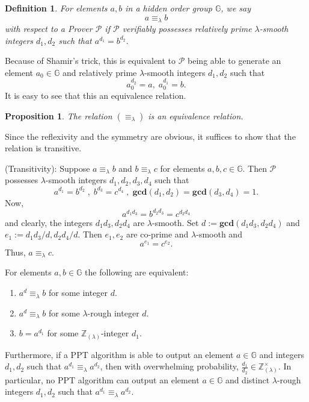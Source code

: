\documentclass[11pt, lettersize, notitlepage, leqno, footskip=0.6cm]{article}
\newcommand{\bz}{\mathbb Z}
\newcommand{\eqlam}{\equiv_{\lam}}
\newcommand{\mc}{\mathcal}
\newcommand{\mb}{\mathbb}
\newcommand{\mbf}{\mathbf}
\newcommand{\lam}{\lambda}
\newcommand{\lamb}{\lambda}
\newcommand{\bzlam}{\bz_{(\lam)}}
\newcommand{\vs}{\vspace{-0.15cm}}
\newcommand{\op}{overwhelming probability}
\newcommand{\GCD}{\mbf{gcd}}
\newtheorem{Prop}[Thm]{Proposition}
\newtheorem{Def}{Definition}[section]
\numberwithin{equation}{section}
\begin{document}
\begin{Def} For elements $a, b$ in a hidden order group $\mb{G}$, we say \vs $$ a \equiv_{\lam} b$$ with respect to a Prover $\mc{P}$ if $\mc{P}$ verifiably possesses  relatively prime $\lamb$-smooth integers $d_1, d_2$ such that $a^{d_1} = b^{d_2}.$\end{Def}

\noindent Because of Shamir's trick, this is equivalent to $\mc{P}$ being able to generate an element $a_0\in \mb{G}$ and relatively prime $\lamb$-smooth integers $d_1, d_2$ such that \vs $$a_0^{d_2} = a, \; a_0^{d_1} = b.$$ It is easy to see that this an equivalence relation.

\begin{Prop} The relation $(\equiv_{\lam})$ is an equivalence relation.\end{Prop}

\begin{prf} Since the reflexivity and the symmetry are obvious, it suffices to show that the relation is transitive.

\noindent (Transitivity): Suppose $a \equiv_{\lam} b$ and $b \equiv_{\lam} c$ for elements $a, b, c\in\mb{G}$. Then $\mc{P}$ possesses $\lam$-smooth integers $d_1,d_2, d_3, d_4$ such that \vs $$a^{d_1} = b^{d_2}\;,\; b^{d_3} = c^{d_4}\;,\;\GCD(d_1,d_2) = \GCD(d_3,d_4) = 1.$$ Now, \vs $$a^{d_1d_3} = b^{d_2d_3} = c^{d_2 d_4}$$ and clearly, the integers $d_1d_3, d_2 d_4$ are $\lam$-smooth. Set $d:= \GCD(d_1d_3, d_2 d_4)$ and $e_1:= d_1d_3/d, d_2 d_4/d$. Then $e_1,e_2$ are co-prime and $\lam$-smooth and \vs $$ a^{e_1} = c^{e_2} .$$ Thus, $a \equiv_{\lam} c$.\end{prf}

For elements $a,b\in\mb{G}$ the following are equivalent:\begin{enumerate}[wide, labelwidth=!, labelindent=0pt] \vs

\item $a^d\eqlam b$ for some integer $d$.\vs
\item $a^d\eqlam b$ for some $\lam$-rough integer $d$.\vs
\item $b = a^{d_1}$ for some $\bzlam$-integer $d_1$.\end{enumerate}

Furthermore, if a PPT algorithm is able to output an element $a\in\mb{G}$ and integers $d_1,d_2$ such that $a^{d_1}\eqlam a^{d_2}$, then with \op, $\frac{d_1}{d_2}\in\bzlam^{\times}$. In particular, no PPT algorithm can output an element $a\in \mb{G}$ and distinct $\lam$-rough integers $d_1,d_2$ such that $a^{d_1}\eqlam a^{d_2}$.
\end{document}
